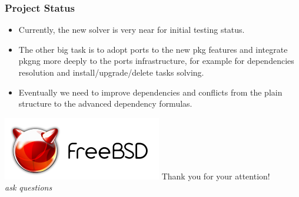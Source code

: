 \documentclass{beamer}
\begin{document}
\begin{frame}
\frametitle{Project Status}
\begin{itemize}
  \item Currently, the new solver is very near for initial testing status.
  \item The other big task is to adopt ports to the new pkg features and
  integrate pkgng more deeply to the ports infrastructure, for example for dependencies resolution and
install/upgrade/delete tasks solving.
  \item Eventually we need to improve dependencies and conflicts from the plain
  structure to the advanced dependency formulas.
\end{itemize} 
\end{frame}

\begin{frame}
\begin{center}
\includegraphics{logo.pdf}
{\Large Thank you for your attention!} \\
\emph{ask questions}
\end{center}
\end{frame}
\end{document}
